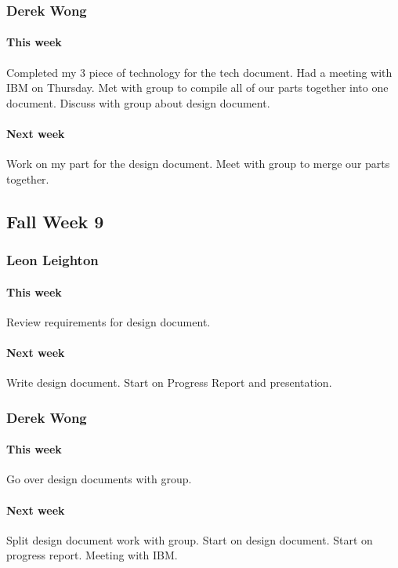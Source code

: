 \documentclass[10pt,letterpaper,onecolumn,draftclsnofoot]{IEEEtran}
\begin{document}
\subsubsection{Derek Wong}
\paragraph{This week}Completed my 3 piece of technology for the tech document.                     
Had a meeting with IBM on Thursday.               
Met with group to compile all of our parts together into one document.                
Discuss with group about design document.
\paragraph{Next week}Work on my part for the design document.                       
Meet with group to merge our parts together.

\subsection{Fall Week 9}
\subsubsection{Leon Leighton}
\paragraph{This week}Review requirements for design document.
\paragraph{Next week}Write design document. Start on Progress Report and presentation.

\subsubsection{Derek Wong}
\paragraph{This week}Go over design documents with group.
\paragraph{Next week}Split design document work with group.                  
Start on design document.                
Start on progress report.             
Meeting with IBM.
\end{document}
